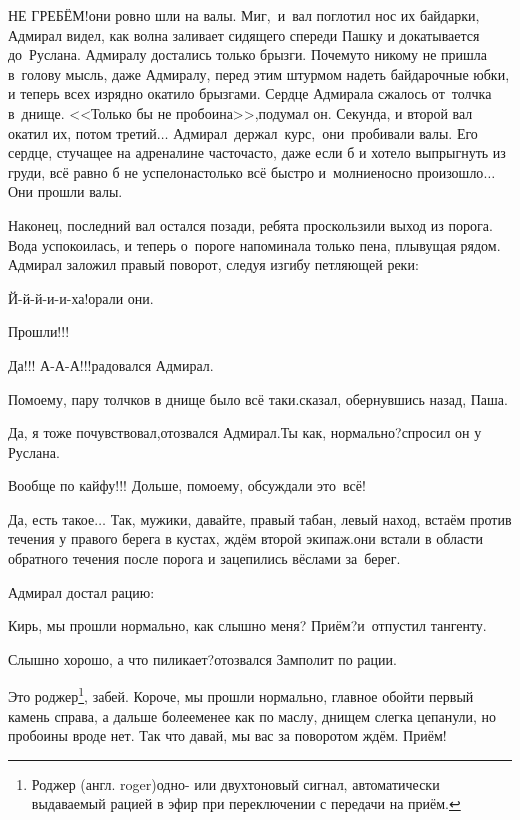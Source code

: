 \diagdash НЕ ГРЕБЁМ!\mdash они ровно шли на валы. Миг,~и~вал поглотил нос их байдарки, Адмирал видел, как волна заливает сидящего спереди Пашку и докатывается до~Руслана. Адмиралу достались только брызги. Почему\sdash то никому не пришла в~голову мысль, даже Адмиралу, перед этим штурмом надеть байдарочные юбки, и теперь всех изрядно окатило брызгами. Сердце Адмирала сжалось от~толчка в~днище. <<Только бы не пробоина>>,\mdash подумал он. Секунда, и второй вал окатил их, потом третий$\ldots$ Адмирал~держал~курс,~они~пробивали валы. Его сердце, стучащее на адреналине часто\sdash часто, даже если б и хотело выпрыгнуть из груди, всё равно б не успело\mdash настолько всё быстро и~молниеносно произошло$\ldots$ Они прошли валы. 

Наконец, последний вал остался позади, ребята проскользили выход из порога. Вода успокоилась, и теперь о~пороге напоминала только пена, плывущая рядом. Адмирал заложил правый поворот, следуя изгибу петляющей реки:

\diagdash Й-й-й-и-и-ха!\mdash орали они.

\diagdash Прошли!!!

\diagdash Да!!! А-А-А!!!\mdash радовался Адмирал.

\diagdash По\sdash моему, пару толчков в днище было всё таки.\mdash сказал, обернувшись назад, Паша. 

\diagdash Да, я тоже почувствовал,\mdash отозвался Адмирал.\mdash Ты как, нормально?\mdash спросил он у Руслана.

\diagdash Вообще по кайфу!!! Дольше, по\sdash моему, обсуждали это~всё!

\diagdash Да, есть такое$\ldots$ Так, мужики, давайте, правый табан, левый наход, встаём против течения у правого берега в кустах, ждём второй экипаж.\mdash они встали в области обратного течения после порога и зацепились вёслами за~берег.

Адмирал достал рацию:

\diagdash Кирь, мы прошли нормально, как слышно меня? Приём?\mdash и~отпустил тангенту.

\diagdash Слышно хорошо, а что пиликает?\mdash отозвался Замполит по рации.

\renewcommand*{\thefootnote}{\fnsymbol{footnote}}
\setcounter{footnote}{0}
\diagdash Это роджер\footnote{Роджер (англ. roger)\mdash одно- или двухтоновый сигнал, автоматически выдаваемый рацией в эфир при переключении с передачи на приём.}, забей. Короче, мы прошли нормально, главное обойти первый камень справа, а дальше более\sdash менее как по маслу, днищем слегка цепанули, но пробоины вроде нет. Так что давай, мы вас за поворотом ждём. Приём!


